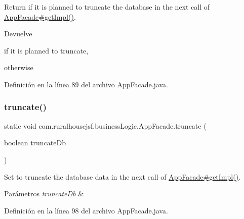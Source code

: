 Return if it is planned to truncate the database in the next call of \mbox{\hyperlink{classcom_1_1ruralhousejsf_1_1business_logic_1_1_app_facade_a029bcceee98b9070b9f80abc54db45d6}{App\+Facade\#get\+Impl()}}. 

\begin{DoxyReturn}{Devuelve}

\begin{DoxyCode}{0}
\DoxyCodeLine{\textcolor{keyword}{true} }
\end{DoxyCode}
 if it is planned to truncate,
\begin{DoxyCode}{0}
\DoxyCodeLine{\textcolor{keyword}{false} }
\end{DoxyCode}
 otherwise 
\end{DoxyReturn}


Definición en la línea 89 del archivo App\+Facade.\+java.

\mbox{\label{classcom_1_1ruralhousejsf_1_1business_logic_1_1_app_facade_a98aed1ed8a03c6a92e15121fed4eb452}} 
\subsubsection{\texorpdfstring{truncate()}{truncate()}}
{\footnotesize\ttfamily static void com.\+ruralhousejsf.\+business\+Logic.\+App\+Facade.\+truncate (\begin{DoxyParamCaption}\item[{boolean}]{truncate\+Db }\end{DoxyParamCaption})\hspace{0.3cm}{\ttfamily [static]}}



Set to truncate the database data in the next call of \mbox{\hyperlink{classcom_1_1ruralhousejsf_1_1business_logic_1_1_app_facade_a029bcceee98b9070b9f80abc54db45d6}{App\+Facade\#get\+Impl()}}. 


\begin{DoxyParams}{Parámetros}
{\em truncate\+Db} & \\
\hline
\end{DoxyParams}


Definición en la línea 98 del archivo App\+Facade.\+java.



